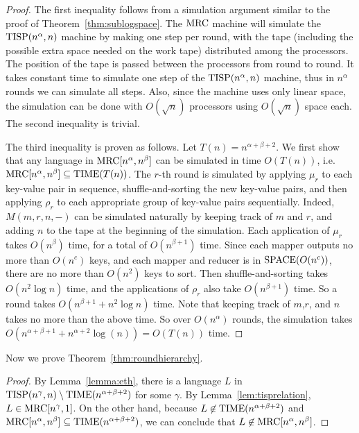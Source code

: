 \documentclass{llncs}
\newcommand{\mrc}{\textup{MRC}}
\newcommand{\SPACE}{\textup{SPACE}}
\newcommand{\TIME}{\textup{TIME}}
\newcommand{\TISP}{\textup{TISP}}
\begin{document}
\begin{proof} The first inequality follows from a simulation argument similar
to the proof of Theorem~\ref{thm:sublogspace}. The $\mrc$ machine will simulate
the $\TISP(n^\alpha,n)$ machine by making one step per round, with the tape
(including the possible extra space needed on the work tape) distributed among
the processors.  The position of the tape is passed between the processors from
round to round.  It takes constant time to simulate one step of the
$\TISP(n^\alpha,n)$ machine, thus in $n^\alpha$ rounds we can simulate all
steps.  Also, since the machine uses only linear space, the simulation can be
done with $O(\sqrt{n})$ processors using $O(\sqrt{n})$ space each.  The second
inequality is trivial.

The third inequality is proven as follows. Let $T(n) = n^{\alpha+\beta+2}$.
We first show that any language in $\mrc[n^\alpha,n^\beta]$ can be simulated in
time $O(T(n))$, i.e. $\mrc[n^\alpha,n^\beta] \subseteq \TIME(T(n))$. The $r$-th
round is simulated by applying $\mu_r$ to each key-value pair in sequence,
shuffle-and-sorting the new key-value pairs, and then applying $\rho_r$ to each
appropriate group of key-value pairs sequentially. Indeed, $M(m,r,n,-)$ can be
simulated naturally by keeping track of $m$ and $r$, and adding $n$ to the tape
at the beginning of the simulation. Each application of $\mu_r$ takes
$O(n^\beta)$ time, for a total of $O(n^{\beta+1})$ time. Since each mapper
outputs no more than $O(n^c)$ keys, and each mapper and reducer is in
$\SPACE(O(n^c))$, there are no more than $O(n^2)$ keys to sort. Then
shuffle-and-sorting takes $O(n^2 \log n)$ time, and the applications of
$\rho_r$ also take $O(n^{\beta+1})$ time. So a round takes $O(n^{\beta+1} +
n^2 \log n)$ time. Note that keeping track of $m$,$r$, and $n$ takes no more
than the above time. So over $O(n^\alpha)$ rounds, the simulation takes
$O(n^{\alpha+\beta+1}+n^{\alpha+2} \log(n))=O(T(n))$ time. \end{proof}

Now we prove Theorem~\ref{thm:roundhierarchy}.

\begin{proof}
By Lemma~\ref{lemma:eth}, there is a language $L$ in $\TISP(n^\gamma,
n)\setminus \TIME(n^{\alpha+\beta+2})$ for some $\gamma$. By
Lemma~\ref{lem:tisprelation}, $L\in \mrc[n^\gamma, 1]$. On the other hand,
because $L\not\in  \TIME(n^{\alpha+\beta+2})$ and $\mrc[n^\alpha, n^\beta]\subseteq
\TIME(n^{\alpha+\beta+2})$, we can conclude that $L\not\in
\mrc[n^\alpha, n^\beta]$.
\end{proof}
\end{document}
